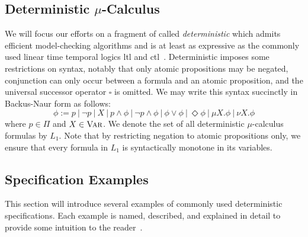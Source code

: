 
\subsection{\texorpdfstring{Deterministic $\mu$-Calculus}{Deterministic mu-Calculus}}\label{prelims:deterministic_mucalc}

We will focus our efforts on a fragment of \mucalc{} called {\em deterministic\/\mucalc{}\/} which admits efficient model-checking algorithms and is at least as expressive as the commonly used linear time temporal logics \gls{ltl} and \gls{ctl}~\cite{Karaman2009}. Deterministic \mucalc{} imposes some restrictions on syntax, notably that only atomic propositions may be negated, conjunction can only occur between a formula and an atomic proposition, and the universal successor operator $\square$ is omitted. We may write this syntax succinctly in Backus-Naur form as follows:
\[ 
\phi := p \ | \ \lnot p \ | \ X \ | \ p \land \phi \ | \ \lnot p \land \phi \ | \ \phi \lor \phi \ | \ \Diamond \phi \ | \ \mu X.\phi \ | \ \nu X. \phi
\]
where $p \in \Pi$ and $X \in \textsc{Var}$. We denote the set of all deterministic $\mu$-calculus formulas by $L_1$. Note that by restricting negation to atomic propositions only, we ensure that every formula in $L_1$ is syntactically monotone in its variables.






\subsection{Specification Examples}\label{prelims:spec_examples}

This section will introduce several examples of commonly used deterministic \mucalc{} specifications. Each example is named, described, and explained in detail to provide some intuition to the reader~\cite{Karaman2009}.

